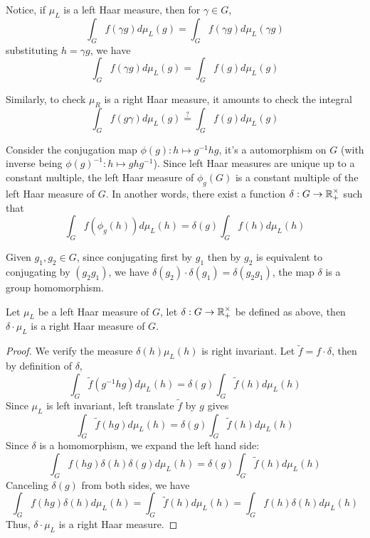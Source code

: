 
Notice, if $\mu_L$ is a left Haar measure, then for $\gamma \in G$,
\[
  \int_G f(\gamma g) d \mu_L(g) = \int_G f(\gamma g) d\mu_L(\gamma g)
\]
substituting $h = \gamma g$, we have
\[
  \int_G f(\gamma g) d \mu_L(g) = \int_G f(g) d\mu_L(g)
\]

Similarly, to check $\mu_R$ is a right Haar measure, it amounts to check the
integral
\[
  \int_G f(g \gamma) d \mu_L(g) \stackrel{?}{=} \int_G f(g) d \mu_L(g)
\]

Consider the conjugation map $\phi(g) : h \mapsto g^{-1} h g$, it's a
automorphism on $G$ (with inverse being $\phi(g)^{-1} : h \mapsto g h g^{-1}$).
Since left Haar measures are unique up to a constant multiple, the left Haar
measure of $\phi_g(G)$ is a constant multiple of the left Haar measure of $G$.
In another words, there exist a function $\delta : G \to \operatorname{\mathbb{R}}_+^{\times}$ such that
\[
  \int_G f(\phi_g(h)) d\mu_L(h) = \delta(g) \int_G f(h) d\mu_L(h)
\]

Given $g_1, g_2 \in G$, since conjugating first by $g_1$ then by $g_2$ is
equivalent to conjugating by $(g_2g_1)$, we have $\delta(g_2) \cdot \delta(g_1)
= \delta(g_2g_1)$, the map $\delta$ is a group homomorphism.

\begin{lem}
  Let $\mu_L$ be a left Haar measure of $G$, let $\delta : G \to \operatorname{\mathbb{R}}_+^{\times}$
  be defined as above, then $\delta \cdot \mu_L$ is a right Haar measure of $G$.
\end{lem}

\begin{proof}
  We verify the measure $\delta(h)\mu_L(h)$ is right invariant.  Let
  $\widetilde{f} = f \cdot \delta$, then by definition of $\delta$,
  \[
    \int_G \widetilde{f}(g^{-1} h g) d\mu_L(h) =
    \delta(g) \int_G \widetilde{f}(h) d\mu_L(h)
  \]
  Since $\mu_L$ is left invariant, left translate $\widetilde{f}$ by $g$ gives
  \[
    \int_G \widetilde{f}(hg) d\mu_L(h) = \delta(g) \int_G \widetilde{f}(h) d\mu_L(h)
  \]
  Since $\delta$ is a homomorphism, we expand the left hand side:
  \[
    \int_G f(hg) \delta(h) \delta(g) d\mu_L(h) = \delta(g) \int_G \widetilde{f}(h) d\mu_L(h)
  \]
  Canceling $\delta(g)$ from both sides, we have
  \[
    \int_G f(hg) \delta(h) d\mu_L(h) = \int_G \widetilde{f}(h) d\mu_L(h) =
    \int_G f(h) \delta(h) d\mu_L(h)
  \]
  Thus, $\delta \cdot \mu_L$ is a right Haar measure.
\end{proof}

